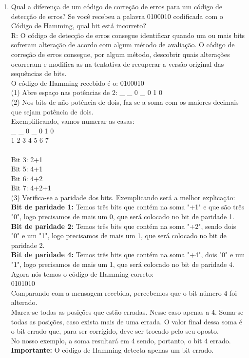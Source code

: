 \documentclass{article}
\begin{document}
\begin{enumerate}
	\item Qual a diferença de um código de correção de erros para um código de detecção de erros? Se você recebeu a palavra 0100010 codificada com o Código de Hamming, qual bit está incorreto?
	\\R: O código de detecção de erros consegue identificar quando um ou mais bits sofreram alteração de acordo com algum método de avaliação. O código de correção de erros consegue, por algum método, descobrir quais alterações ocorreram e modifica-as na tentativa de recuperar a versão original das sequências de bits.
	\\O código de Hamming recebido é o: 0100010
	\\(1) Abre espaço nas potências de 2: \_ \_ 0 \_ 0 1 0 
	\\(2) Nos bits de não potência de dois, faz-se a soma com os maiores decimais que sejam potência de dois.
	\\Exemplificando, vamos numerar as casas:
	\\ \_ \_ 0 \_ 0 1 0
	\\  1 2 3 4 5 6	7
	\\
	\\Bit 3: 2+1
	\\Bit 5: 4+1
	\\Bit 6: 4+2
	\\Bit 7: 4+2+1
	\\(3) Verifica-se a paridade dos bits. Exemplicando será a melhor explicação:
	\\\textbf{Bit de paridade 1:} Temos três bits que contém na soma "+1" e que são três "0", logo precisamos de mais um 0, que será colocado no bit de paridade 1.
	\\\textbf{Bit de paridade 2:} Temos três bits que contém na soma "+2", sendo dois "0" e um "1", logo precisamos de mais um 1, que será colocado no bit de paridade 2.
	\\\textbf{Bit de paridade 4:} Temos três bits que contém na soma "+4", dois "0" e um "1", logo precisamos de mais um 1, que será colocado no bit de paridade 4.
	\\Agora nós temos o código de Hamming correto:
	\\0101010
	\\Comparando com a mensagem recebida, percebemos que o bit número 4 foi alterado.
	\\Marca-se todas as posições que estão erradas. Nesse caso apenas a 4. Soma-se todas as posições, caso exista mais de uma errada. O valor final dessa soma é o bit errado que, para ser corrigido, deve ser trocado pelo seu oposto.
	\\No nosso exemplo, a soma resultará em 4 sendo, portanto, o bit 4 errado.
	\\\textbf{Importante:} O código de Hamming detecta apenas um bit errado.


\end{enumerate}
\end{document}
